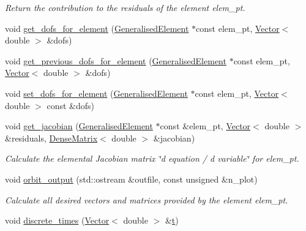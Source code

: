 \begin{DoxyCompactItemize}
\begin{DoxyCompactList}\small\item\em Return the contribution to the residuals of the element elem\+\_\+pt. \end{DoxyCompactList}\item 
void \hyperlink{classoomph_1_1PeriodicOrbitAssemblyHandler_a9e8d41c8ad79134466a1a50c11c62dc3}{get\+\_\+dofs\+\_\+for\+\_\+element} (\hyperlink{classoomph_1_1GeneralisedElement}{Generalised\+Element} $\ast$const elem\+\_\+pt, \hyperlink{classoomph_1_1Vector}{Vector}$<$ double $>$ \&dofs)
\item 
void \hyperlink{classoomph_1_1PeriodicOrbitAssemblyHandler_a681a727dc0a463e924aa88e0e691e2c6}{get\+\_\+previous\+\_\+dofs\+\_\+for\+\_\+element} (\hyperlink{classoomph_1_1GeneralisedElement}{Generalised\+Element} $\ast$const elem\+\_\+pt, \hyperlink{classoomph_1_1Vector}{Vector}$<$ double $>$ \&dofs)
\item 
void \hyperlink{classoomph_1_1PeriodicOrbitAssemblyHandler_a3d1d9f709e983495dac3113b8e716843}{set\+\_\+dofs\+\_\+for\+\_\+element} (\hyperlink{classoomph_1_1GeneralisedElement}{Generalised\+Element} $\ast$const elem\+\_\+pt, \hyperlink{classoomph_1_1Vector}{Vector}$<$ double $>$ const \&dofs)
\item 
void \hyperlink{classoomph_1_1PeriodicOrbitAssemblyHandler_a6d901ecdefca1c59403a4ae4b215446f}{get\+\_\+jacobian} (\hyperlink{classoomph_1_1GeneralisedElement}{Generalised\+Element} $\ast$const \&elem\+\_\+pt, \hyperlink{classoomph_1_1Vector}{Vector}$<$ double $>$ \&residuals, \hyperlink{classoomph_1_1DenseMatrix}{Dense\+Matrix}$<$ double $>$ \&jacobian)
\begin{DoxyCompactList}\small\item\em Calculate the elemental Jacobian matrix \char`\"{}d equation 
/ d variable\char`\"{} for elem\+\_\+pt. \end{DoxyCompactList}\item 
void \hyperlink{classoomph_1_1PeriodicOrbitAssemblyHandler_a51b7db6467c46b417b3e630d0ef96a8f}{orbit\+\_\+output} (std\+::ostream \&outfile, const unsigned \&n\+\_\+plot)
\begin{DoxyCompactList}\small\item\em Calculate all desired vectors and matrices provided by the element elem\+\_\+pt. \end{DoxyCompactList}\item 
void \hyperlink{classoomph_1_1PeriodicOrbitAssemblyHandler_a555a59c5c5b5dd2e08a31f6c6e176611}{discrete\+\_\+times} (\hyperlink{classoomph_1_1Vector}{Vector}$<$ double $>$ \&\hyperlink{cfortran_8h_af6f0bd3dc13317f895c91323c25c2b8f}{t})

\end{DoxyCompactItemize}

